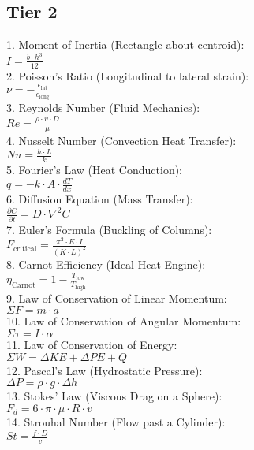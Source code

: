 \documentclass{article}
\begin{document}
\begin{multicols}{2}
\section*{Tier 2}
1. Moment of Inertia (Rectangle about centroid): \\
   \( I = \frac{b \cdot h^3}{12} \) \\
2. Poisson's Ratio (Longitudinal to lateral strain): \\
   \( \nu = -\frac{\epsilon_{\text{lat}}}{\epsilon_{\text{long}}} \) \\
3. Reynolds Number (Fluid Mechanics): \\
   \( Re = \frac{\rho \cdot v \cdot D}{\mu} \) \\
4. Nusselt Number (Convection Heat Transfer): \\
   \( Nu = \frac{h \cdot L}{k} \) \\
5. Fourier's Law (Heat Conduction): \\
   \( q = -k \cdot A \cdot \frac{dT}{dx} \) \\
6. Diffusion Equation (Mass Transfer): \\
   \( \frac{\partial C}{\partial t} = D \cdot \nabla^2 C \) \\
7. Euler's Formula (Buckling of Columns): \\
   \( F_{\text{critical}} = \frac{\pi^2 \cdot E \cdot I}{(K \cdot L)^2} \) \\
8. Carnot Efficiency (Ideal Heat Engine): \\
   \( \eta_{\text{Carnot}} = 1 - \frac{T_{\text{low}}}{T_{\text{high}}} \) \\
9. Law of Conservation of Linear Momentum: \\
   \( \Sigma F = m \cdot a \) \\
10. Law of Conservation of Angular Momentum: \\
    \( \Sigma \tau = I \cdot \alpha \) \\
11. Law of Conservation of Energy: \\
    \( \Sigma W = \Delta KE + \Delta PE + Q \) \\
12. Pascal's Law (Hydrostatic Pressure): \\
    \( \Delta P = \rho \cdot g \cdot \Delta h \) \\
13. Stokes' Law (Viscous Drag on a Sphere): \\
    \( F_d = 6 \cdot \pi \cdot \mu \cdot R \cdot v \) \\
14. Strouhal Number (Flow past a Cylinder): \\
    \( St = \frac{f \cdot D}{v} \) \\

\end{multicols}
\end{document}
